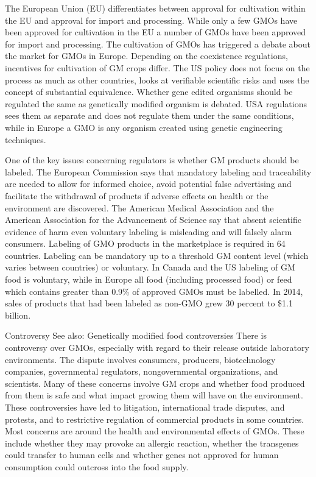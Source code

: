 The European Union (EU) differentiates between approval for cultivation within the EU and approval for import and processing. While only a few GMOs have been approved for cultivation in the EU a number of GMOs have been approved for import and processing. The cultivation of GMOs has triggered a debate about the market for GMOs in Europe. Depending on the coexistence regulations, incentives for cultivation of GM crops differ. The US policy does not focus on the process as much as other countries, looks at verifiable scientific risks and uses the concept of substantial equivalence. Whether gene edited organisms should be regulated the same as genetically modified organism is debated. USA regulations sees them as separate and does not regulate them under the same conditions, while in Europe a GMO is any organism created using genetic engineering techniques.

One of the key issues concerning regulators is whether GM products should be labeled. The European Commission says that mandatory labeling and traceability are needed to allow for informed choice, avoid potential false advertising and facilitate the withdrawal of products if adverse effects on health or the environment are discovered. The American Medical Association and the American Association for the Advancement of Science say that absent scientific evidence of harm even voluntary labeling is misleading and will falsely alarm consumers. Labeling of GMO products in the marketplace is required in 64 countries. Labeling can be mandatory up to a threshold GM content level (which varies between countries) or voluntary. In Canada and the US labeling of GM food is voluntary, while in Europe all food (including processed food) or feed which contains greater than 0.9\% of approved GMOs must be labelled. In 2014, sales of products that had been labeled as non-GMO grew 30 percent to \$1.1 billion.

Controversy
See also: Genetically modified food controversies
There is controversy over GMOs, especially with regard to their release outside laboratory environments. The dispute involves consumers, producers, biotechnology companies, governmental regulators, nongovernmental organizations, and scientists. Many of these concerns involve GM crops and whether food produced from them is safe and what impact growing them will have on the environment. These controversies have led to litigation, international trade disputes, and protests, and to restrictive regulation of commercial products in some countries. Most concerns are around the health and environmental effects of GMOs. These include whether they may provoke an allergic reaction, whether the transgenes could transfer to human cells and whether genes not approved for human consumption could outcross into the food supply.

